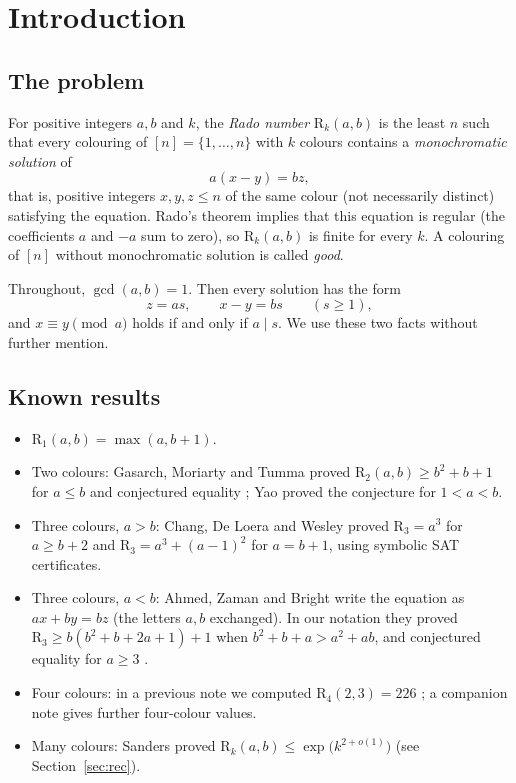 \documentclass[11pt,a4paper]{article}
\theoremstyle{definition}
\theoremstyle{remark}
\newcommand{\R}{\mathrm{R}}
\begin{document}
{\setcounter{tocdepth}{1}\small
\makeatletter\renewcommand{\l@section}{\@dottedtocline{1}{0em}{1.5em}}\makeatother
\renewcommand{\contentsname}{\normalsize Contents}%
\tableofcontents}
\clearpage

\section{Introduction}

\subsection{The problem}
For positive integers $a,b$ and $k$, the \emph{Rado number} $\R_k(a,b)$ is the least $n$ such that every colouring of $[n]=\{1,\dots,n\}$ with $k$ colours contains a \emph{monochromatic solution} of
\[
  a(x-y)=bz ,
\]
that is, positive integers $x,y,z\le n$ of the same colour (not necessarily distinct) satisfying the equation. Rado's theorem \cite{Rado33} implies that this equation is regular (the coefficients $a$ and $-a$ sum to zero), so $\R_k(a,b)$ is finite for every $k$. A colouring of $[n]$ without monochromatic solution is called \emph{good}.

Throughout, $\gcd(a,b)=1$. Then every solution has the form
\begin{equation}\label{eq:sol}
  z=as,\qquad x-y=bs\qquad(s\ge1),
\end{equation}
and $x\equiv y\pmod a$ holds if and only if $a\mid s$. We use these two facts without further mention.

\subsection{Known results}
\begin{itemize}
\item $\R_1(a,b)=\max(a,b+1)$.
\item Two colours: Gasarch, Moriarty and Tumma \cite[Theorem~3.3]{GMT12} proved $\R_2(a,b)\ge b^2+b+1$ for $a\le b$ and conjectured equality \cite[Conjecture~3.4]{GMT12}; Yao \cite{Yao14} proved the conjecture for $1<a<b$.
\item Three colours, $a>b$: Chang, De Loera and Wesley \cite{CDW22} proved $\R_3=a^3$ for $a\ge b+2$ and $\R_3=a^3+(a-1)^2$ for $a=b+1$, using symbolic SAT certificates.
\item Three colours, $a<b$: Ahmed, Zaman and Bright \cite{AZB25} write the equation as $ax+by=bz$ (the letters $a,b$ exchanged). In our notation they proved $\R_3\ge b(b^2+b+2a+1)+1$ when $b^2+b+a>a^2+ab$, and conjectured equality for $a\ge3$ \cite[Theorem~1.3 and Conjecture~1.1]{AZB25}.
\item Four colours: in a previous note we computed $\R_4(2,3)=226$ \cite{Ich26a}; a companion note \cite{Ich26b} gives further four-colour values.
\item Many colours: Sanders \cite{San26} proved $\R_k(a,b)\le\exp\bigl(k^{2+o(1)}\bigr)$ (see Section~\ref{sec:rec}).
\end{itemize}
\end{document}
